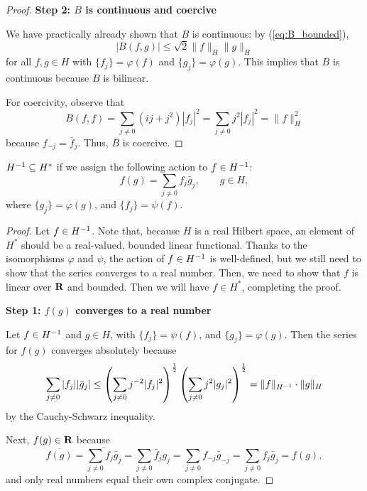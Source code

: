 \documentclass{homework}
\begin{document}
\begin{arabicparts}
\begin{proof}
			\textbf{Step 2: $B$ is continuous and coercive}
			
			We have practically already shown that $B$ is continuous: by (\ref{eq:B_bounded}),
			\begin{equation}
				|B(f,g)| \le \sqrt{2}\lVert f\rVert_H\lVert g\rVert_H
			\end{equation}
			for all $f,g\in H$ with $\{f_j\} = \varphi(f)$ and $\{g_j\} = \varphi(g)$. This implies that $B$ is continuous because $B$ is bilinear.
			
			For coercivity, observe that
			\begin{equation}
				B(f,f) = \sum_{j\ne0}(ij+j^2)|f_j|^2 = \sum_{j\ne0}j^2|f_j|^2 = \lVert f \rVert_H^2
			\end{equation}
			because $f_{-j} = \bar{f}_j$. Thus, $B$ is coercive.
		\end{proof}
		
		\questionpart
		${H^{-1}} \subseteq H^*$ if we assign the following action to $f \in {H^{-1}}$:
		\begin{equation}
			f(g) = \sum_{j\ne0}f_j\bar{g}_j, \qquad g\in H,
		\end{equation}
		where $\{g_j\}=\varphi(g)$, and $\{f_j\} = \psi(f)$.
		
		\begin{proof}
			Let $f\in {H^{-1}}$. Note that, because $H$ is a real Hilbert space, an element of $H^*$ should be a real-valued, bounded linear functional. Thanks to the isomorphisms $\varphi$ and $\psi$, the action of $f \in {H^{-1}}$ is well-defined, but we still need to show that the series converges to a real number. Then, we need to show that $f$ is linear over $\textnormal{\bf R}$ and bounded. Then we will have $f \in H^*$, completing the proof.
			
			\textbf{Step 1: $f(g)$ converges to a real number}
			
			Let $f \in {H^{-1}}$ and $g\in H$, with $\{f_j\} = \psi(f)$, and $\{g_j\} = \varphi(g)$. Then the series for $f(g)$ converges absolutely because
			\begin{equation}
				\label{eq:f_bounded}
				\sum_{j\ne0}|f_j||\bar{g}_j| \le \left(\sum_{j\ne0}j^{-2}|f_j|^2\right)^\frac{1}{2}\left(\sum_{j\ne0}j^2|g_j|^2\right)^\frac{1}{2} = \lVert f\rVert_{H^{-1}}\cdot\lVert g\rVert_H
			\end{equation}
			by the Cauchy-Schwarz inequality.
			
			Next, $f(g) \in \textnormal{\bf R}$ because
			\begin{equation}
				\overline{f(g)}=\overline{\sum_{j\ne0}f_j\bar{g}_j} = \sum_{j\ne0}\bar{f}_jg_j = \sum_{j\ne0}f_{-j}\bar{g}_{-j} = \sum_{j\ne0}f_j\bar{g}_j = f(g),
			\end{equation}
			and only real numbers equal their own complex conjugate.
			

\end{proof}
\end{arabicparts}
\end{document}

